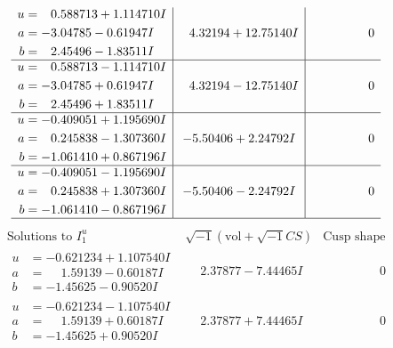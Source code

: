 \documentclass[1p]{elsarticle_modified}
\theoremstyle{definition}
\newcommand{\I}{\sqrt{-1}}
\begin{document}
$$\begin{array}{c|c|c}
\begin{aligned}
u &= \phantom{-}0.588713 + 1.114710 I \\
a &= -3.04785 - 0.61947 I \\
b &= \phantom{-}2.45496 - 1.83511 I\end{aligned}
 & \phantom{-}4.32194 + 12.75140 I & \phantom{-0.000000 } 0 \\ \hline\begin{aligned}
u &= \phantom{-}0.588713 - 1.114710 I \\
a &= -3.04785 + 0.61947 I \\
b &= \phantom{-}2.45496 + 1.83511 I\end{aligned}
 & \phantom{-}4.32194 - 12.75140 I & \phantom{-0.000000 } 0 \\ \hline\begin{aligned}
u &= -0.409051 + 1.195690 I \\
a &= \phantom{-}0.245838 - 1.307360 I \\
b &= -1.061410 + 0.867196 I\end{aligned}
 & -5.50406 + 2.24792 I & \phantom{-0.000000 } 0 \\ \hline\begin{aligned}
u &= -0.409051 - 1.195690 I \\
a &= \phantom{-}0.245838 + 1.307360 I \\
b &= -1.061410 - 0.867196 I\end{aligned}
 & -5.50406 - 2.24792 I & \phantom{-0.000000 } 0\\
 \hline 
 \end{array}$$\newpage$$\begin{array}{c|c|c}  
\text{Solutions to }I^u_{1}& \I (\text{vol} + \sqrt{-1}CS) & \text{Cusp shape}\\
 \hline 
\begin{aligned}
u &= -0.621234 + 1.107540 I \\
a &= \phantom{-}1.59139 - 0.60187 I \\
b &= -1.45625 - 0.90520 I\end{aligned}
 & \phantom{-}2.37877 - 7.44465 I & \phantom{-0.000000 } 0 \\ \hline\begin{aligned}
u &= -0.621234 - 1.107540 I \\
a &= \phantom{-}1.59139 + 0.60187 I \\
b &= -1.45625 + 0.90520 I\end{aligned}
 & \phantom{-}2.37877 + 7.44465 I & \phantom{-0.000000 } 0 \\ \hline\begin{aligned}

\end{aligned}
\end{array}$$
\end{document}
